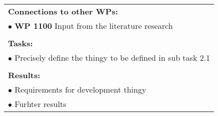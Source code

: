\begin{table}[!h]
\begin{center}
\begin{tabular}{|p{}||p{}|p{}||p{}|}
            \multicolumn{4}{|p{.95\columnwidth}|}{\textbf{Connections to other WPs:}}\\
            \multicolumn{4}{|p{.95\columnwidth}|}{$\bullet$ \textbf{WP 1100} Input from the literature research}\\
            \multicolumn{4}{|p{.95\columnwidth}|}{}\\
            \multicolumn{4}{|p{.95\columnwidth}|}{\textbf{Tasks:}}\\
            \multicolumn{4}{|p{.95\columnwidth}|}{$\bullet$ Precisely define the thingy to be defined in sub task 2.1}\\
            \multicolumn{4}{|p{.95\columnwidth}|}{}\\
            \multicolumn{4}{|p{.95\columnwidth}|}{\textbf{Results:}}\\
            \multicolumn{4}{|p{.95\columnwidth}|}{$\bullet$ Requirements for development thingy}\\
            \multicolumn{4}{|p{.95\columnwidth}|}{$\bullet$ Furhter results}\\
            \hline
        \end{tabular}
    \end{center}
\end{table}

\clearpage

